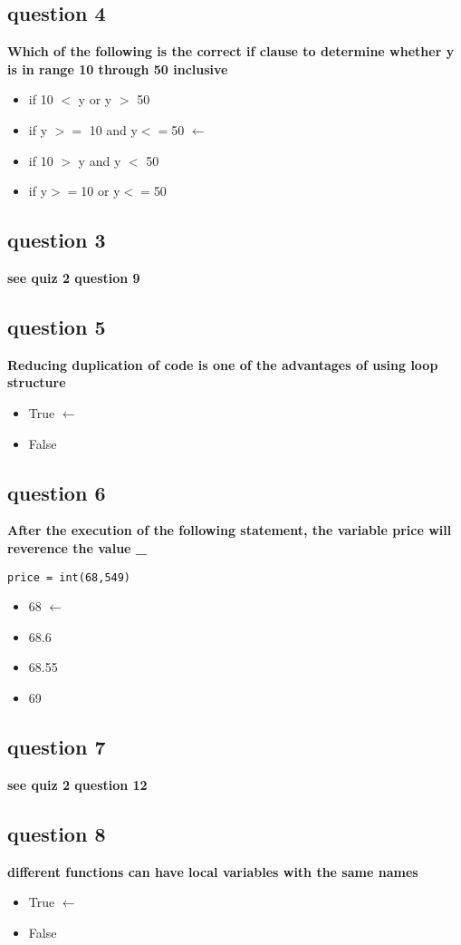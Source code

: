 \documentclass[10pt]{article}
\begin{document}
\subsection*{question 4}
\textbf{Which of the following is the correct if clause to determine whether y is in range 10 through 50 inclusive}
\begin{itemize}
\item if 10 $<$ y or y $>$ 50
\item if y $>=$ 10 and y$<=$50 $\leftarrow$
\item if 10 $>$ y and y $<$ 50
\item if y$>=$10 or y$<=$50
\end{itemize}
\subsection*{question 3}
\textbf{see quiz 2 question 9}
\subsection*{question 5}
\textbf{Reducing duplication of code is one of the advantages of using loop structure}
\begin{itemize}
\item True $\leftarrow$
\item False
\end{itemize}
\subsection*{question 6}
\textbf{After the execution of the following statement, the variable price will reverence the value \_}
\begin{verbatim}
price = int(68,549)
\end{verbatim}
\begin{itemize}
\item 68 $\leftarrow$
\item 68.6
\item 68.55
\item 69
\end{itemize}
\subsection*{question 7}
\textbf{see quiz 2 question 12}
\subsection*{question 8}
\textbf{different functions can have local variables with the same names}
\begin{itemize}
\item True $\leftarrow$
\item False
\end{itemize}
\end{document}
